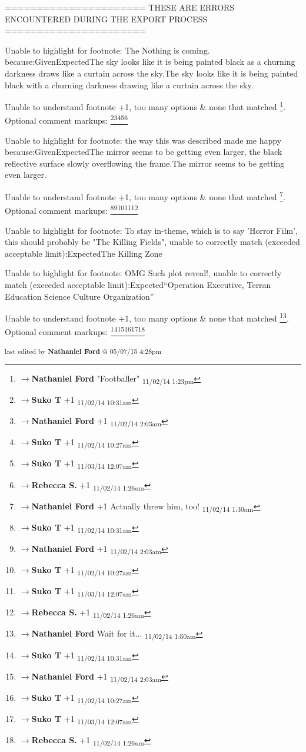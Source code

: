 ======================
THESE ARE ERRORS ENCOUNTERED DURING THE EXPORT PROCESS
======================

	Unable to highlight for footnote: The Nothing is coming. because:GivenExpectedThe sky looks like it is being painted black as a churning darkness draws like a curtain across the sky.The sky looks like it is being painted black with a churning darkness drawing like a curtain across the sky.

	Unable to understand footnote +1, too many options & none that matched \footnote{$\rightarrow$\textbf{Nathaniel Ford }"Footballer" \textsubscript{11/02/14 1:23pm}}. Optional comment markups: \footnote{$\rightarrow$\textbf{Suko T }+1 \textsubscript{11/02/14 10:31am}}\footnote{$\rightarrow$\textbf{Nathaniel Ford }+1 \textsubscript{11/02/14 2:03am}}\footnote{$\rightarrow$\textbf{Suko T }+1 \textsubscript{11/02/14 10:27am}}\footnote{$\rightarrow$\textbf{Suko T }+1 \textsubscript{11/03/14 12:07am}}\footnote{$\rightarrow$\textbf{Rebecca S. }+1 \textsubscript{11/02/14 1:26am}} 

	Unable to highlight for footnote: the way this was described made me happy because:GivenExpectedThe mirror seems to be getting even larger, the black reflective surface slowly overflowing the frame.The mirror seems to be getting even larger.

	Unable to understand footnote +1, too many options & none that matched \footnote{$\rightarrow$\textbf{Nathaniel Ford }+1 Actually threw him, too! \textsubscript{11/02/14 1:30am}}. Optional comment markups: \footnote{$\rightarrow$\textbf{Suko T }+1 \textsubscript{11/02/14 10:31am}}\footnote{$\rightarrow$\textbf{Nathaniel Ford }+1 \textsubscript{11/02/14 2:03am}}\footnote{$\rightarrow$\textbf{Suko T }+1 \textsubscript{11/02/14 10:27am}}\footnote{$\rightarrow$\textbf{Suko T }+1 \textsubscript{11/03/14 12:07am}}\footnote{$\rightarrow$\textbf{Rebecca S. }+1 \textsubscript{11/02/14 1:26am}} 

	Unable to highlight for footnote: To stay in-theme, which is to say 'Horror Film', this should probably be "The Killing Fields", unable to correctly match (exceeded acceptable limit):ExpectedThe Killing Zone

	Unable to highlight for footnote: OMG
Such plot reveal!, unable to correctly match (exceeded acceptable limit):Expected“Operation Executive, Terran Education Science Culture Organization”

	Unable to understand footnote +1, too many options & none that matched \footnote{$\rightarrow$\textbf{Nathaniel Ford }Wait for it... \textsubscript{11/02/14 1:50am}}. Optional comment markups: \footnote{$\rightarrow$\textbf{Suko T }+1 \textsubscript{11/02/14 10:31am}}\footnote{$\rightarrow$\textbf{Nathaniel Ford }+1 \textsubscript{11/02/14 2:03am}}\footnote{$\rightarrow$\textbf{Suko T }+1 \textsubscript{11/02/14 10:27am}}\footnote{$\rightarrow$\textbf{Suko T }+1 \textsubscript{11/03/14 12:07am}}\footnote{$\rightarrow$\textbf{Rebecca S. }+1 \textsubscript{11/02/14 1:26am}} 


\fi

\vspace{\fill}

\begin{flushright}
\textsubscript{last edited by \textbf{Nathaniel Ford} @ 05/07/15 4:28pm}
\end{flushright}

